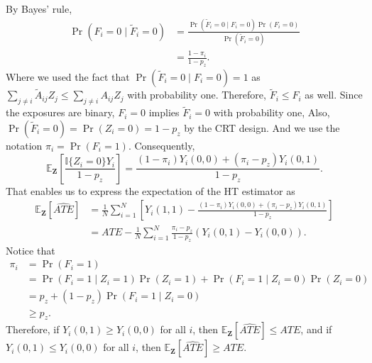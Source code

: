 \documentclass{article}[12pt]
\theoremstyle{definition}
\def \bZ {\boldsymbol{Z}}
\def \EX {\mathbb{E}}
\begin{document}
By Bayes' rule,
\begin{equation*}
    \begin{aligned}
        \Pr(F_i = 0 \mid \widetilde{F}_i=0) 
        &=
        \frac{
            \Pr(\widetilde{F}_i=0 \mid F_i=0) \Pr(F_i=0)
        }{
        \Pr(\widetilde{F}_i=0)
        }
        \\ &=
        \frac{
            1-\pi_i
        }{
          1-p_z
        }.
    \end{aligned}
\end{equation*}
Where we used the fact that $ \Pr(\widetilde{F}_i=0 \mid F_i=0) = 1$
as $\sum_{j\neq i}\widetilde{A}_{ij}Z_j \leq \sum_{j\neq i}A_{ij}Z_j$ with 
probability one. Therefore, $\widetilde{F}_i \leq F_i$ as well. Since 
the exposures are binary, $F_i=0$ implies $\widetilde{F}_i=0$ with probability one,
Also, $\Pr(\widetilde{F}_i=0) = \Pr(Z_i=0) = 1-p_z$ by the CRT design.
And we use the notation $\pi_i = \Pr(F_i=1)$.
Consequently,
\begin{equation*}
     \EX_{\bZ} \left[\frac{
            \mathbb{I}\{Z_i=0\}Y_i}{1 - p_z}
        \right] 
        = 
        \frac{
            (1- \pi_i)Y_i(0,0) + (\pi_i-p_z)Y_i(0,1)
        }{
            1-p_z
        }.
\end{equation*}
That enables us to express the expectation of the HT estimator as
\begin{equation*}
    \begin{aligned}
        \EX_{\bZ}[\widehat{ATE}] 
        &=
        \frac{1}{N}
        \sum_{i=1}^{N}
        \left[
        Y_i(1,1)
        -
        \frac{
            (1- \pi_i)Y_i(0,0) + (\pi_i-p_z)Y_i(0,1)
        }{
            1-p_z
        }
        \right]
        \\ &=
        ATE
        -
        \frac{1}{N}
        \sum_{i=1}^{N}
        \frac{
            \pi_i-p_z 
        }{
            1-p_z
        }
        \left(Y_i(0,1) - Y_i(0,0)\right).
    \end{aligned}
\end{equation*}
Notice that 
\begin{equation*}
    \begin{aligned}
        \pi_i &=
        \Pr\left(F_i=1\right)
        \\ &= 
        \Pr\left(F_i = 1 \mid Z_i=1\right) \Pr(Z_i=1)
        + \Pr\left(F_i = 1 \mid Z_i=0\right) \Pr(Z_i=0)
        \\ &=
        p_z + (1-p_z) \Pr\left(F_i = 1 \mid Z_i=0\right)
        \\ & \geq p_z.
    \end{aligned}
\end{equation*}
Therefore, if $Y_i(0,1) \geq Y_i(0,0)$ for all $i$,
then $\EX_{\bZ}[\widehat{ATE}] \leq ATE$, and if 
$Y_i(0,1) \leq Y_i(0,0)$ for all $i$,
then $\EX_{\bZ}[\widehat{ATE}] \geq ATE$.
\end{document}
